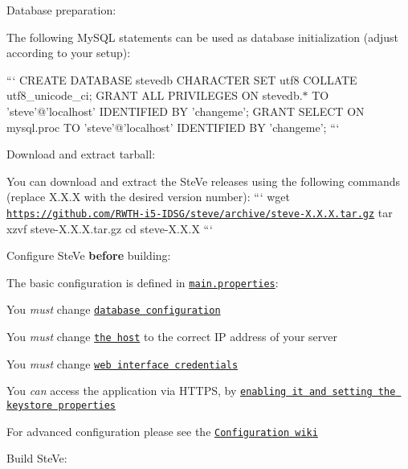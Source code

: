 \begin{DoxyEnumerate}
\item Database preparation\+:

The following My\+S\+Q\+L statements can be used as database initialization (adjust according to your setup)\+:

``` C\+R\+E\+A\+T\+E D\+A\+T\+A\+B\+A\+S\+E stevedb C\+H\+A\+R\+A\+C\+T\+E\+R S\+E\+T utf8 C\+O\+L\+L\+A\+T\+E utf8\+\_\+unicode\+\_\+ci; G\+R\+A\+N\+T A\+L\+L P\+R\+I\+V\+I\+L\+E\+G\+E\+S O\+N stevedb.$\ast$ T\+O 'steve'@'localhost' I\+D\+E\+N\+T\+I\+F\+I\+E\+D B\+Y 'changeme'; G\+R\+A\+N\+T S\+E\+L\+E\+C\+T O\+N mysql.\+proc T\+O 'steve'@'localhost' I\+D\+E\+N\+T\+I\+F\+I\+E\+D B\+Y 'changeme'; ```
\item Download and extract tarball\+:

You can download and extract the Ste\+Ve releases using the following commands (replace X.\+X.\+X with the desired version number)\+: ``` wget \href{https://github.com/RWTH-i5-IDSG/steve/archive/steve-X.X.X.tar.gz}{\tt https\+://github.\+com/\+R\+W\+T\+H-\/i5-\/\+I\+D\+S\+G/steve/archive/steve-\/\+X.\+X.\+X.\+tar.\+gz} tar xzvf steve-\/\+X.\+X.\+X.\+tar.\+gz cd steve-\/\+X.\+X.\+X ```
\item Configure Ste\+Ve {\bfseries before} building\+:

The basic configuration is defined in \href{src/main/resources/config/prod/main.properties}{\tt main.\+properties}\+:
\begin{DoxyItemize}
\item You {\itshape must} change \href{src/main/resources/config/prod/main.properties#L3-L7}{\tt database configuration}
\item You {\itshape must} change \href{src/main/resources/config/prod/main.properties#L16}{\tt the host} to the correct I\+P address of your server
\item You {\itshape must} change \href{src/main/resources/config/prod/main.properties#L11-L12}{\tt web interface credentials}
\item You {\itshape can} access the application via H\+T\+T\+P\+S, by \href{src/main/resources/config/prod/main.properties#L26-L29}{\tt enabling it and setting the keystore properties}
\end{DoxyItemize}

For advanced configuration please see the \href{https://github.com/RWTH-i5-IDSG/steve/wiki/Configuration}{\tt Configuration wiki}
\item Build Ste\+Ve\+:


\end{DoxyEnumerate}
